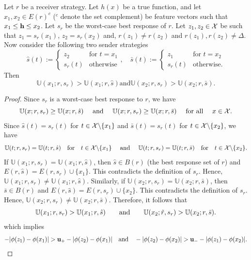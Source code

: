 \begin{lem}\label{lem:helping lemma}
	Let $r$ be a receiver strategy. Let $h(x)$ be a true function, and let $x_1, x_2 \in E(r)^c$ ($^c$ denote the set complement) be feature vectors such that $x_1 \leq \mathbf{h} \leq x_2$. Let $s_r$ be the worst-case best response of $r$. Let $z_1,z_2 \in \mathcal{X}$ be such that $z_1 = s_r(x_1)$, $z_2 = s_r(x_2)$ and, $r(z_1) \neq r(z_2)$ and $r(z_1),r(z_2) \neq \Delta$. Now consider the following two sender strategies \begin{equation}\label{eqn:s hat and s bar}
		\hat{s}(t) :=
		\begin{cases}
			z_2 & \text{for } t = x_1  \\
			s_{r}(t) & \text{otherwise}
		\end{cases},\quad
		\bar{s}(t) :=
		\begin{cases}
			z_1 & \text{for } t = x_2 \\
			s_{r}(t) & \text{otherwise}.
		\end{cases}
	\end{equation}
Then
\[\mathbb{U}(x_1;r,s_r) > \mathbb{U}(x_1;r,\hat{s}) \text{and} \mathbb{U}(x_2;r,s_r) > \mathbb{U}(x_2;r,\bar{s}).\]
\end{lem}

\begin{proof}\label{proof:helping lemma}
    Since $s_{r}$ is a worst-case best response to $r$, we have $$\mathbb{U}(x; r, s_r) \geq \mathbb{U}(x; r, \hat{s}) \text{ and } \mathbb{U}(x; r, s_r) \geq \mathbb{U}(x; r, \bar{s}) \text{ for all } x \in \cg{X}.$$ Since $\hat{s}(t) = s_{r}(t)$ for $t \in \mathcal{X} \backslash  \{x_1\}$ and $\bar{s}(t) = s_{r}(t)$ for $t \in \mathcal{X} \backslash \{x_2\}$, we have
	\[\mathbb{U}(t; r, s_{r}) = \mathbb{U}(t; r, \hat{s}) \text{for} t \in \cg{X} \backslash \{x_1\} \text{ and } \mathbb{U}(t; r, s_{r}) = \mathbb{U}(t; r, \bar{s}) \text{for} t \in \cg{X} \backslash \{x_2\}.\]
	If $\mathbb{U}(x_1; r, s_r) = \mathbb{U}(x_1; r, \hat{s})$, then $\hat{s} \in B(r)$ (the best response set of $r$) and $E(r, \hat{s}) = E(r, s_{r}) \cup \{x_1\}$. This contradicts the definition of $s_{r}$. Hence, $\mathbb{U}(x_1; r, s_{r}) \neq \mathbb{U}(x_1; r, \hat{s})$. Similarly, if $\mathbb{U}(x_2; r, s_{r}) = \mathbb{U}(x_2; r, \bar{s})$, then $\bar{s} \in B(r)$ and $E(r, \hat{s}) = E(r, s_{r}) \cup \{x_2\}$. This contradicts the definition of $s_{r}$. Hence, $\mathbb{U}(x_2; r, s_{r}) \neq \mathbb{U}(x_2; r, \bar{s})$.
	Therefore, it follows that
	\begin{equation*}
		\mathbb{U}(x_1; r, s_{r}) > \mathbb{U}(x_1; r, \hat{s}) \quad \hbox{\quad and\quad} \quad \mathbb{U}(x_2; \tilde{r}, s_{r}) > \mathbb{U}(x_2; r, \bar{s}).
	\end{equation*}
	which implies
	\begin{equation*}
		-|\phi(z_1) - \phi(x_1)| > \mathbf{u_+} -|\phi(z_2) - \phi(x_1)| \hbox{\quad and\quad} -|\phi(z_2) - \phi(x_2)| > \mathbf{u_-} - |\phi(z_1) - \phi(x_2)|.
	\end{equation*}
\end{proof}

